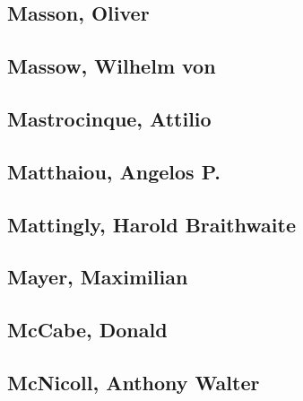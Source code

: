 \subsection[Masson, Oliver (2)]{Masson, Oliver}


\subsection[Massow, Wilhelm von (1)]{Massow, Wilhelm von}

\subsection[Mastrocinque, Attilio (2)]{Mastrocinque, Attilio}


\subsection[Matthaiou, Angelos P. (1)]{Matthaiou, Angelos P.}

\subsection[Mattingly, Harold Braithwaite (1)]{Mattingly, Harold Braithwaite}

\subsection[Mayer, Maximilian (1)]{Mayer, Maximilian}

\subsection[McCabe, Donald (1)]{McCabe, Donald}

\subsection[McNicoll, Anthony Walter (1)]{McNicoll, Anthony Walter}

